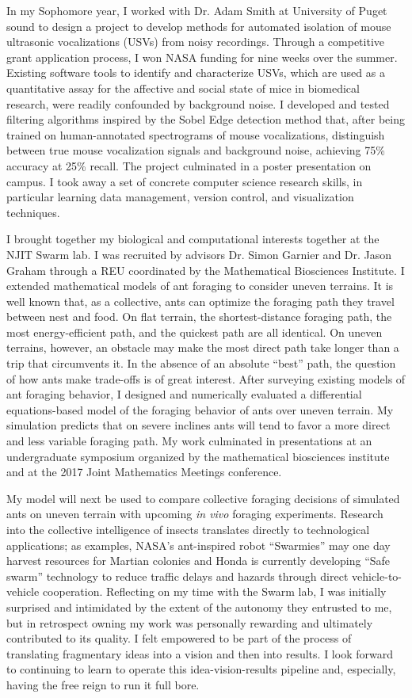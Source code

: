 In my Sophomore year, I worked with Dr. Adam Smith at University of Puget sound to design a project to develop methods for automated isolation of mouse
ultrasonic vocalizations (USVs) from noisy recordings.
Through a competitive grant application process, I won NASA funding for nine weeks over the summer.
Existing software tools to identify and characterize USVs, which are used as a quantitative assay for the affective and social state of mice in biomedical research, were readily confounded by background noise.
I developed and tested filtering algorithms inspired by the Sobel Edge detection method that, after being trained on human-annotated spectrograms of mouse vocalizations, distinguish between true mouse vocalization signals and background noise, achieving 75\% accuracy at 25\% recall.
The project culminated in a poster presentation on campus.
I took away a set of concrete computer science research skills, in particular learning data management, version control, and visualization techniques.

I brought together my biological and computational interests together at the NJIT Swarm lab.
I was recruited by advisors Dr. Simon Garnier and Dr. Jason Graham through a REU coordinated by the Mathematical Biosciences Institute.
I extended mathematical models of ant foraging to consider uneven terrains.
It is well known that, as a collective, ants can optimize the foraging path they travel between nest and food.
On flat terrain, the shortest-distance foraging path, the most energy-efficient path, and the quickest path are all identical.
On uneven terrains, however, an obstacle may make the most direct path take longer than a trip that circumvents it.
In the absence of an absolute ``best'' path, the question of how ants make trade-offs is of great interest.
After surveying existing models of ant foraging behavior, I designed and numerically evaluated a differential equations-based model of the foraging behavior of ants over uneven terrain.
My simulation predicts that on severe inclines ants will tend to favor a more direct and less variable foraging path.
My work culminated in presentations at an undergraduate symposium organized by the mathematical biosciences institute and at the 2017 Joint Mathematics Meetings conference.

My model will next be used to compare collective foraging decisions of simulated ants on uneven terrain with upcoming \textit{in vivo} foraging experiments.
Research into the collective intelligence of insects translates directly to technological applications;
as examples, NASA's ant-inspired robot ``Swarmies'' may one day harvest resources for Martian colonies and Honda is currently developing ``Safe swarm'' technology to reduce traffic delays and hazards through direct vehicle-to-vehicle cooperation.
Reflecting on my time with the Swarm lab, I was initially surprised and intimidated by the extent of the autonomy they entrusted to me, but in retrospect owning my work was personally rewarding and ultimately contributed to its quality.
I felt empowered to be part of the process of translating fragmentary ideas into a vision and then into results.
I look forward to continuing to learn to operate this idea-vision-results pipeline and, especially, having the free reign to run it full bore.

